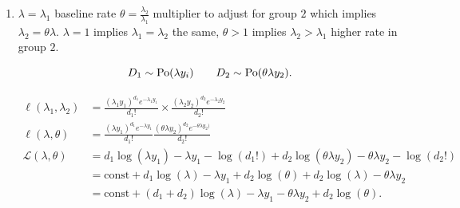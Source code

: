\documentclass[10pt, a4paper]{article}
\begin{document}
\begin{problem}
\begin{solution}
\begin{enumerate}[label = (\alph*)]
            \begin{align*}
                \ell(\lambda_i) &= \frac{(y_i\lambda_i) ^ {d_i}e ^ {-\lambda_i y_i}}{d_i!}\footnotemark \\
                &= c_i\lambda_i ^ {d_i}e ^ {-\lambda_i y_i} \\
                \mathcal{L}(\lambda) &= \text{const} + d_i\log{\lambda_i} - \lambda_iy_i \\
                \mathcal{L};(\lambda) &= \frac{d_i}{\lambda_i} - y_i
                \intertext{At MLE,
                $\lambda_i = \hat{\lambda}_i$}
                0 &= \frac{d_i}{\hat{\lambda}_i} - y_i \iff \hat{\lambda}_i = \frac{d_i}{y_i}
            \end{align*}
            \[
            \hat{\lambda}_1 = \frac{17}{2768.9} = 0.00614,\qquad \hat{\lambda}_2 = \frac{28}{1857.5} = 0.0151.
            \]

            Observed information:
            \[
            I(\hat{\lambda}_1) = -\mathcal{L}''(\hat{\lambda}_i) = -\left(-\frac{d_i}{\hat{\lambda}_i ^ 2}\right) = \frac{d_i}{(d_i / y_i) ^ 2} = \frac{y_i ^ 2}{d_i}.
            \]

            \item
            $\lambda = \lambda_1$ baseline rate $\theta = \frac{\lambda_2}{\lambda_1}$ multiplier to adjust for group $2$ which implies $\lambda_2 = \theta\lambda$.
            $\lambda = 1$ implies $\lambda_1 = \lambda_2$ the same,
            $\theta > 1$ implies $\lambda_2 > \lambda_1$ higher rate in group $2$.

            \[
            D_1 \sim \operatorname{Po}(\lambda y_i)\qquad D_2 \sim \operatorname{Po}(\theta\lambda y_2).
            \]

            \begin{align*}
                \ell(\lambda_1, \lambda_2) &= \frac{(\lambda_1 y_1) ^ {d_1}e ^ {-\lambda_1 y_1}}{d_1!} \times \frac{(\lambda_2y_2) ^ {d_2}e ^ {-\lambda_2y_2}}{d_2!} \\
                \ell(\lambda, \theta) &= \frac{(\lambda y_1) ^ {d_1}e ^ {-\lambda y_1}}{d_1!} \frac{(\theta\lambda y_2) ^ {d_2}e ^ {-\theta\lambda y_2)}}{d_2!} \\
                \mathcal{L}(\lambda, \theta) &= d_1\log(\lambda y_1) - \lambda y_1 - \log(d_1!) + d_2\log(\theta\lambda y_2) - \theta\lambda y_2 - \log(d_2!) \\
                &= \text{const} + d_1\log(\lambda) - \lambda y_1 + d_2\log(\theta) + d_2\log(\lambda) - \theta\lambda y_2 \\
                &= \text{const} + (d_1 + d_2)\log(\lambda) - \lambda y_1 - \theta\lambda y_2 + d_2\log(\theta).
            \end{align*}


\end{enumerate}
\end{solution}
\end{problem}
\end{document}
